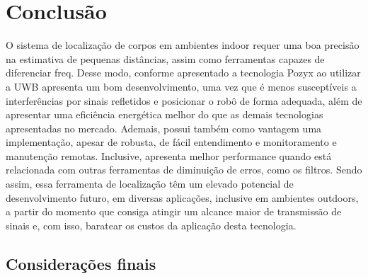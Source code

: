 \chapter{Conclusão}
\label{chap:conc}

O sistema de localização de corpos em ambientes indoor requer uma boa precisão na estimativa de pequenas distâncias, assim como ferramentas capazes de diferenciar freq. Desse modo, conforme apresentado a tecnologia Pozyx ao utilizar a UWB apresenta um bom desenvolvimento, uma vez que é menos susceptíveis a interferências por sinais refletidos e posicionar o robô de forma adequada, além de apresentar uma eficiência energética melhor do que as demais tecnologias apresentadas no mercado. Ademais, possui também como vantagem uma implementação, apesar de robusta, de fácil entendimento e monitoramento e manutenção remotas. Inclusive, apresenta melhor performance quando está relacionada com outras ferramentas de diminuição de erros, como os filtros. Sendo assim, essa ferramenta de localização têm um elevado potencial de desenvolvimento futuro, em diversas aplicações, inclusive em ambientes outdoors, a partir do momento que consiga atingir um alcance maior de transmissão de sinais e, com isso, baratear os custos da aplicação desta tecnologia.

\section{Considerações finais}
\label{sec:consid}



